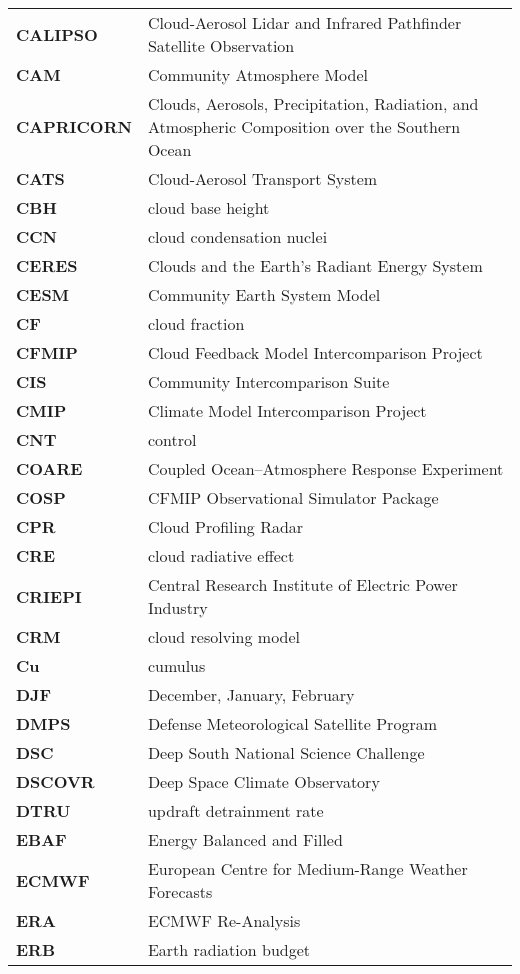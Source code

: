 \begin{longtable}{@{}p{2cm}p{20cm}}
\textbf{CALIPSO} & Cloud-Aerosol Lidar and Infrared Pathfinder Satellite
Observation\\
\textbf{CAM} & Community Atmosphere Model\\
\textbf{CAPRICORN} & Clouds, Aerosols, Precipitation, Radiation, and Atmospheric
Composition over the Southern Ocean\\
\textbf{CATS} & Cloud-Aerosol Transport System\\
\textbf{CBH} & cloud base height\\
\textbf{CCN} & cloud condensation nuclei\\
\textbf{CERES} & Clouds and the Earth’s Radiant Energy System\\
\textbf{CESM} & Community Earth System Model\\
\textbf{CF} & cloud fraction\\
\textbf{CFMIP} & Cloud Feedback Model Intercomparison Project\\
\textbf{CIS} & Community Intercomparison Suite\\
\textbf{CMIP} & Climate Model Intercomparison Project\\
\textbf{CNT} & control\\
\textbf{COARE} & Coupled Ocean–Atmosphere Response Experiment\\
\textbf{COSP} & CFMIP Observational Simulator Package\\
\textbf{CPR} & Cloud Profiling Radar\\
\textbf{CRE} & cloud radiative effect\\
\textbf{CRIEPI} & Central Research Institute of Electric Power Industry\\
\textbf{CRM} & cloud resolving model\\
\textbf{Cu} & cumulus\\
\textbf{DJF} & December, January, February\\
\textbf{DMPS} & Defense Meteorological Satellite Program\\
\textbf{DSC} & Deep South National Science Challenge\\
\textbf{DSCOVR} & Deep Space Climate Observatory\\
\textbf{DTRU} & updraft detrainment rate\\
\textbf{EBAF} & Energy Balanced and Filled\\
\textbf{ECMWF} & European Centre for Medium-Range Weather Forecasts\\
\textbf{ERA} & ECMWF Re-Analysis\\
\textbf{ERB} & Earth radiation budget\\

\end{longtable}
